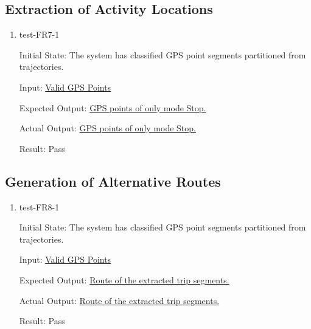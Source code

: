 \documentclass[12pt, titlepage]{article}
\begin{document}
\subsection{Extraction of Activity Locations}
\begin{enumerate}
    \item test-FR7-1\label{test-FR7-1}
    
    Initial State: The system has classified GPS point segments partitioned from trajectories.
    
    Input: \href{https://github.com/paezha/PyERT-BLACK/blob/rev0-test/quarto-example/data/sample-gps/sample-gps-1.csv}{Valid GPS Points}
    
    Expected Output: \href{https://github.com/paezha/PyERT-BLACK/blob/rev0-test/test/test_data/fr-tests/fr7-1-expected.csv}{GPS points of only mode Stop.}
    
    Actual Output: \href{https://github.com/paezha/PyERT-BLACK/blob/rev0-test/test/test_data/fr-tests/fr7-1-out.csv}{GPS points of only mode Stop.}
    
    Result: Pass
\end{enumerate}

\subsection{Generation of Alternative Routes}
\begin{enumerate}
    \item test-FR8-1\label{test-FR8-1}
    
    Initial State: The system has classified GPS point segments partitioned from trajectories.
    
    Input: \href{https://github.com/paezha/PyERT-BLACK/blob/rev0-test/quarto-example/data/sample-gps/sample-gps-1.csv}{Valid GPS Points}
    
    Expected Output: \href{https://github.com/paezha/PyERT-BLACK/blob/rev0-test/test/test_data/fr-tests/fr8-1-expected.shp}{Route of the extracted trip segments.}
    
    Actual Output: \href{https://github.com/paezha/PyERT-BLACK/blob/rev0-test/test/test_data/fr-tests/fr8-1-out.shp}{Route of the extracted trip segments.}
    
    Result: Pass
\end{enumerate}
\end{document}
